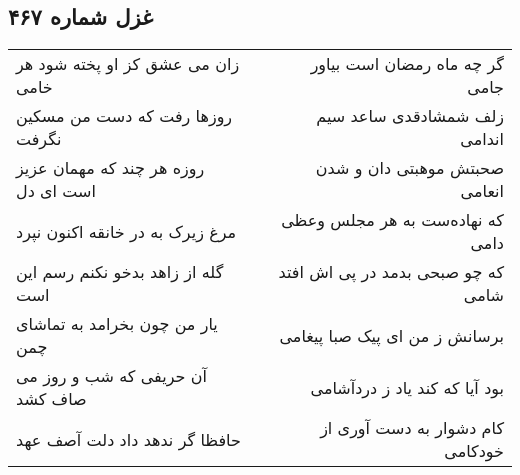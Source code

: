 \begin{center}
\section*{غزل شماره ۴۶۷}
\label{sec:sh467}
\begin{longtable}{l p{0.5cm} r}
زان می عشق کز او پخته شود هر خامی
&&
گر چه ماه رمضان است بیاور جامی
\\
روزها رفت که دست من مسکین نگرفت
&&
زلف شمشادقدی ساعد سیم اندامی
\\
روزه هر چند که مهمان عزیز است ای دل
&&
صحبتش موهبتی دان و شدن انعامی
\\
مرغ زیرک به در خانقه اکنون نپرد
&&
که نهاده‌ست به هر مجلس وعظی دامی
\\
گله از زاهد بدخو نکنم رسم این است
&&
که چو صبحی بدمد در پی اش افتد شامی
\\
یار من چون بخرامد به تماشای چمن
&&
برسانش ز من ای پیک صبا پیغامی
\\
آن حریفی که شب و روز می صاف کشد
&&
بود آیا که کند یاد ز دردآشامی
\\
حافظا گر ندهد داد دلت آصف عهد
&&
کام دشوار به دست آوری از خودکامی
\\
\end{longtable}
\end{center}
